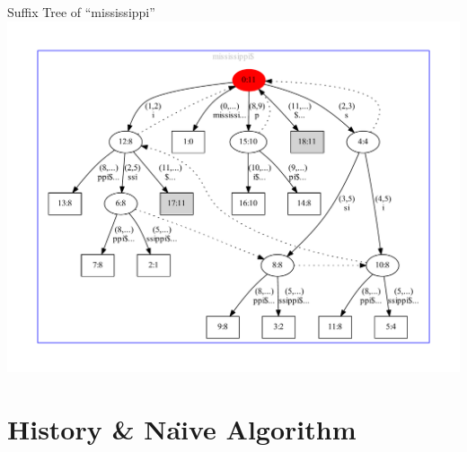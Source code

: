 
\begin{frame}{Suffix Tree of ``mississippi''}
\includegraphics[height=0.8\textheight,trim=40pt 40pt 40pt 40pt]{mississippi_.pdf}
\end{frame}


\section{History \& Na\"{\i}ve Algorithm}

